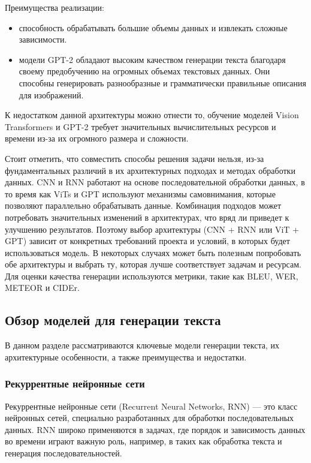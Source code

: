 \documentclass[a4paper,12pt]{extarticle}
\begin{document}
Преимущества реализации:
\begin{itemize}
	\item способность обрабатывать большие объемы данных и извлекать сложные зависимости.
	\item модели GPT-2 обладают высоким качеством генерации текста благодаря своему предобучению на огромных объемах текстовых данных. Они способны генерировать разнообразные и грамматически правильные описания для изображений.
\end{itemize}

К недостатком данной архитектуры можно отнести то, обучение моделей Vision Transformers и GPT-2 требует значительных вычислительных ресурсов и времени из-за их огромного размера и сложности.

Стоит отметить, что совместить способы решения задачи нельзя, из-за фундаментальных различий в их архитектурных подходах и методах обработки данных. CNN и RNN работают на основе последовательной обработки данных, в то время как ViTs и GPT используют механизмы самовнимания, которые позволяют параллельно обрабатывать данные. Комбинация подходов может потребовать значительных изменений в архитектурах, что вряд ли приведет к улучшению результатов. Поэтому выбор архитектуры (CNN + RNN или ViT + GPT) зависит от конкретных требований проекта и условий, в которых будет использоваться модель. В некоторых случаях может быть полезным попробовать обе архитектуры и выбрать ту, которая лучше соответствует задачам и ресурсам. Для оценки качества генерации используются метрики, такие как BLEU, WER, METEOR и CIDEr.

\subsection{Обзор моделей для генерации текста}

В данном разделе рассматриваются ключевые модели генерации текста, их архитектурные особенности, а также преимущества и недостатки.

\subsubsection{Рекуррентные нейронные сети}

Рекуррентные нейронные сети (Recurrent Neural Networks, RNN) — это класс нейронных сетей, специально разработанных для обработки последовательных данных. RNN широко применяются в задачах, где порядок и зависимость данных во времени играют важную роль, например, в таких как обработка текста и генерация последовательностей.
\end{document}
